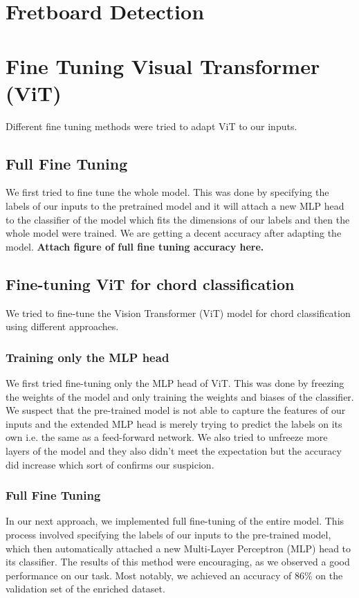 \documentclass[10pt,twocolumn,letterpaper]{article}
\begin{document}
\section{Fretboard Detection}


\section{Fine Tuning Visual Transformer (ViT)}
Different fine tuning methods were tried to adapt ViT to our inputs.
\subsection{Full Fine Tuning}
We first tried to fine tune the whole model. This was done by specifying the labels of our inputs to the pretrained model and it will attach a new MLP head to the classifier of the model which fits the dimensions of our labels and then the whole model were trained. We are getting a decent accuracy after adapting the model. \textbf{Attach figure of full fine tuning accuracy here.}
\subsection{Fine-tuning ViT for chord classification}
We tried to fine-tune the Vision Transformer (ViT) model for chord classification using different approaches.

\subsubsection{Training only the MLP head}
We first tried fine-tuning only the MLP head of ViT. This was done by freezing the weights of the model and only training the weights and biases of the classifier. We suspect that the pre-trained model is not able to capture the features of our inputs and the extended MLP head is merely trying to predict the labels on its own i.e. the same as a feed-forward network. We also tried to unfreeze more layers of the model and they also didn't meet the expectation but the accuracy did increase which sort of confirms our suspicion.

\subsubsection{Full Fine Tuning}
In our next approach, we implemented full fine-tuning of the entire model. This process involved specifying the labels of our inputs to the pre-trained model, which then automatically attached a new Multi-Layer Perceptron (MLP) head to its classifier. The results of this method were encouraging, as we observed a good performance on our task. Most notably, we achieved an accuracy of 86\% on the validation set of the enriched dataset.
\end{document}
